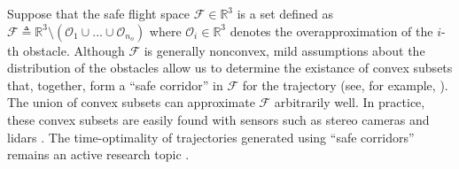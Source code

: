 \documentclass[journal,10pt]{IEEEtran}
\newcommand{\vect}[1]{\boldsymbol{\mathbf{#1}}}
\newif\ifdraft
\newcommand{\XX}[1]{\ifdraft{\color{red}[{\bf XX}: #1]}\fi}
\begin{document}


Suppose that the safe flight space $\mathcal{F} \in \mathbb{R}^3$ is a set defined as $\mathcal{F} \triangleq \mathbb{R}^3\setminus\left(\mathcal{O}_1\cup...\cup\mathcal{O}_{n_o}\right)$ where $\mathcal{O}_i\in \mathbb{R}^3$ denotes the overapproximation of the $i$-th obstacle. Although $\mathcal{F}$ is generally nonconvex, mild assumptions about the distribution of the obstacles allow  us to determine the existance of convex subsets that, together, form a ``safe corridor'' in $\mathcal{F}$ for the trajectory (see, for example, \cite{gao2018online}). The union of convex subsets can approximate $\mathcal{F}$ arbitrarily well. In practice, these convex subsets are easily found with sensors such as stereo cameras and lidars \cite{hornung13auro}. The time-optimality of trajectories generated using ``safe corridors'' remains an active research topic  \cite{tang2019time,sun2020fast}. 

\end{document}
